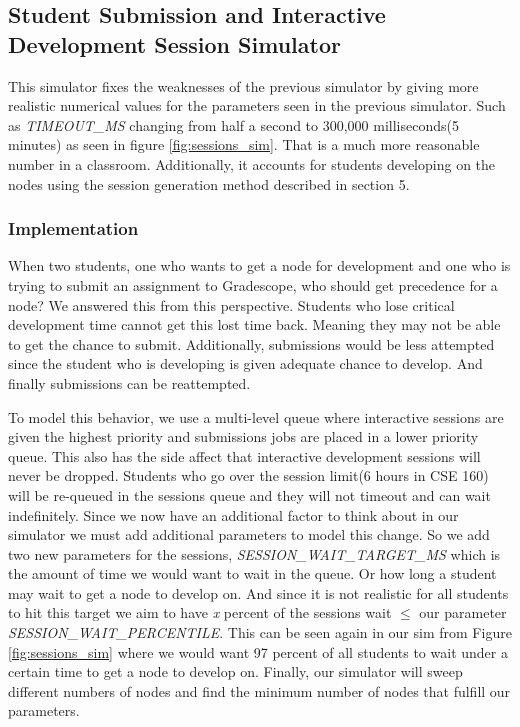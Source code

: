 \documentclass[acmlarge]{acmart}
\begin{document}
\subsection{Student Submission and Interactive Development Session Simulator}
This simulator fixes the weaknesses of the previous simulator by giving more realistic numerical values for the parameters seen in the previous simulator. Such as \textit{TIMEOUT\_MS} changing from half a second to 300,000 milliseconds(5 minutes) as seen in figure \ref{fig:sessions_sim}. That is a much more reasonable number in a classroom. Additionally, it accounts for students developing on the nodes using the session generation method described in section 5. 

\subsubsection{Implementation} When two students, one who wants to get a node for development and one who is trying to submit an assignment to Gradescope, who should get precedence for a node? We answered this from this perspective. Students who lose critical development time cannot get this lost time back. Meaning they may not be able to get the chance to submit. Additionally, submissions would be less attempted since the student who is developing is given adequate chance to develop. And finally submissions can be reattempted. 

To model this behavior, we use a multi-level queue \cite{sattar2014multi} where interactive sessions are given the highest priority and submissions jobs are placed in a lower priority queue. This also has the side affect that interactive development sessions will never be dropped. Students who go over the session limit(6 hours in CSE 160) will be re-queued in the sessions queue and they will not timeout and can wait indefinitely. Since we now have an additional factor to think about in our simulator we must add additional parameters to model this change. So we add two new parameters for the sessions, \textit{SESSION\_WAIT\_TARGET\_MS} which is the amount of time we would want to wait in the queue. Or how long a student may wait to get a node to develop on. And since it is not realistic for all students to hit this target we aim to have \textit{x} percent of the sessions wait $\leq$ our parameter \textit{SESSION\_WAIT\_PERCENTILE}. This can be seen again in our sim from Figure \ref{fig:sessions_sim} where we would want 97 percent of all students to wait under a certain time to get a node to develop on. Finally, our simulator will sweep different numbers of nodes and find the minimum number of nodes that fulfill our parameters. 
\end{document}

